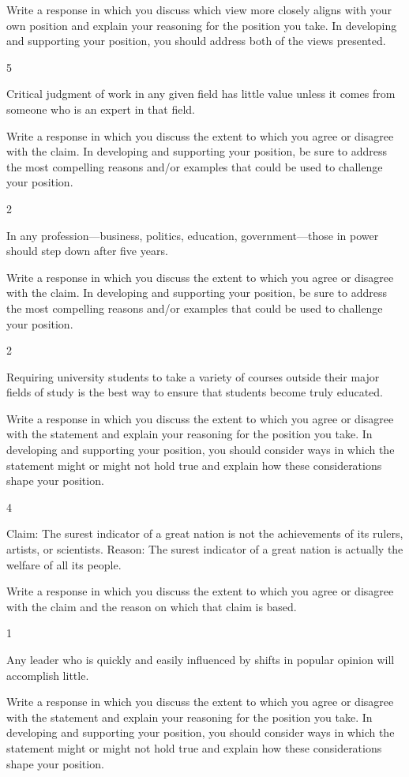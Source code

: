 \documentclass[]{article}
\begin{document}
Write a response in which you discuss which view more closely aligns
with your own position and explain your reasoning for the position you
take. In developing and supporting your position, you should address
both of the views presented.

5

Critical judgment of work in any given field has little value unless it
comes from someone who is an expert in that field.

Write a response in which you discuss the extent to which you agree or
disagree with the claim. In developing and supporting your position, be
sure to address the most compelling reasons and/or examples that could
be used to challenge your position.

2

In any profession---business, politics, education, government---those in
power should step down after five years.

Write a response in which you discuss the extent to which you agree or
disagree with the claim. In developing and supporting your position, be
sure to address the most compelling reasons and/or examples that could
be used to challenge your position.

2

Requiring university students to take a variety of courses outside their
major fields of study is the best way to ensure that students become
truly educated.

Write a response in which you discuss the extent to which you agree or
disagree with the statement and explain your reasoning for the position
you take. In developing and supporting your position, you should
consider ways in which the statement might or might not hold true and
explain how these considerations shape your position.

4

Claim: The surest indicator of a great nation is not the achievements of
its rulers, artists, or scientists. Reason: The surest indicator of a
great nation is actually the welfare of all its people.

Write a response in which you discuss the extent to which you agree or
disagree with the claim and the reason on which that claim is based.

1

Any leader who is quickly and easily influenced by shifts in popular
opinion will accomplish little.

Write a response in which you discuss the extent to which you agree or
disagree with the statement and explain your reasoning for the position
you take. In developing and supporting your position, you should
consider ways in which the statement might or might not hold true and
explain how these considerations shape your position.
\end{document}
